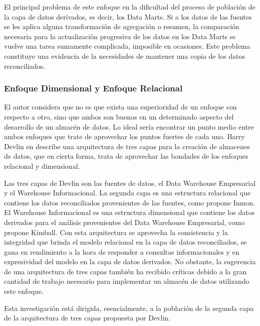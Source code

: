 El principal problema de este enfoque en la dificultad del proceso de poblaci\'on de la capa de datos derivados, es decir, los 
Data Marts. Si a  los datos de las fuentes se les aplica alguna transformaci\'on de agregaci\'on o resumen, la comparaci\'on 
necesaria para la actualización progresiva de los datos en los Data Marts se vuelve una tarea sumamente complicada, imposible en 
ocasiones. Este problema constituye una evidencia de la necesidades de mantener una copia de los datos reconciliados\cite{mijailmaster}.

\subsubsection{Enfoque Dimensional y Enfoque Relacional}

El autor considera que no es que exista una superioridad de un enfoque con respecto a otro, sino que ambos son buenos en 
un determinado aspecto del desarrollo de un almac\'en de datos. Lo ideal ser\'ia encontrar un punto medio entre ambos 
enfoques que trate de aprovechar los puntos fuertes de cada uno. Barry Devlin en \cite{devlin1996data} describe 
una arquitectura de tres capas para la creaci\'on de almacenes de datos, que en cierta forma, trata de aprovechar las 
bondades de los enfoques relacional y dimensional. 

Las tres capas de Devlin son las fuentes de datos, el Data Warehouse Empresarial y el Warehouse Informacional. La segunda capa 
es una estructura relacional que contiene los datos reconciliados provenientes de las fuentes, como propone Inmon. El Warehouse 
Informacional es una estructura dimensional que contiene los datos derivados para el an\'alisis provenientes del Data Warehouse 
Empresarial, como propone Kimball. Con esta arquitectura se aprovecha la consistencia y la integridad que brinda el modelo relacional 
en la capa de datos reconciliados, se gana en rendimiento a la hora de responder a consultas informacionales y en expresividad 
del modelo en la capa de datos derivados. No obstante, la sugerencia de una arquitectura de tres capas también ha recibido críticas 
debido a la gran cantidad de trabajo necesario para implementar un almacén de datos utilizando este enfoque. 

Esta investigación est\'a dirigida, esencialmente, a la poblaci\'on de la segunda capa de la arquitectura de tres 
capas propuesta por Devlin.